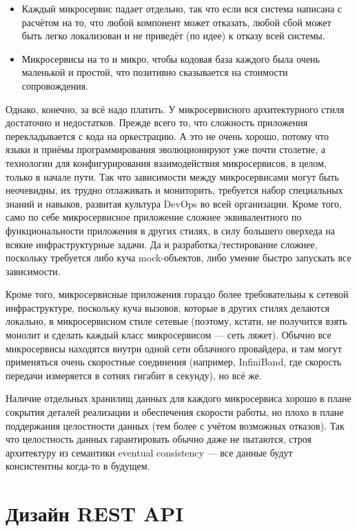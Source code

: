 \documentclass[a5paper]{article}
\begin{document}
\begin{itemize}
    \item Каждый микросервис падает отдельно, так что если вся система написана с расчётом на то, что любой компонент может отказать, любой сбой может быть легко локализован и не приведёт (по идее) к отказу всей системы.
    \item Микросервисы на то и микро, чтобы кодовая база каждого была очень маленькой и простой, что позитивно сказывается на стоимости сопровождения.
\end{itemize}

Однако, конечно, за всё надо платить. У микросервисного архитектурного стиля достаточно и недостатков. Прежде всего то, что сложность приложения перекладывается с кода на оркестрацию. А это не очень хорошо, потому что языки и приёмы программирования эволюционируют уже почти столетие, а технологии для конфигурирования взаимодействия микросервисов, в целом, только в начале пути. Так что зависимости между микросервисами могут быть неочевидны, их трудно отлаживать и мониторить, требуется набор специальных знаний и навыков, развитая культура DevOps во всей организации. Кроме того, само по себе микросервисное приложение сложнее эквивалентного по функциональности приложения в других стилях, в силу большего оверхеда на всякие инфраструктурные задачи. Да и разработка/тестирование сложнее, поскольку требуется либо куча mock-объектов, либо умение быстро запускать все зависимости.

Кроме того, микросервисные приложения гораздо более требовательны к сетевой инфраструктуре, поскольку куча вызовов, которые в других стилях делаются локально, в микросервисном стиле сетевые (поэтому, кстати, не получится взять монолит и сделать каждый класс микросервисом --- сеть ляжет). Обычно все микросервисы находятся внутри одной сети облачного провайдера, и там могут применяться очень скоростные соединения (например, InfiniBand, где скорость передачи измеряется в сотнях гигабит в секунду), но всё же.

Наличие отдельных хранилищ данных для каждого микросервиса хорошо в плане сокрытия деталей реализации и обеспечения скорости работы, но плохо в плане поддержания целостности данных (тем более с учётом возможных отказов). Так что целостность данных гарантировать обычно даже не пытаются, строя архитектуру из семантики eventual consistency --- все данные будут консистентны когда-то в будущем.

\section{Дизайн REST API}
\end{document}
